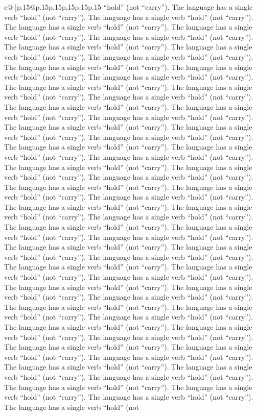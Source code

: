\documentclass{article}
\begin{document}
{\begin{supertabular}{c@{$\;$}|p{.15\linewidth}@{}p{.15\linewidth}p{.15\linewidth}p{.15\linewidth}p{.15\linewidth}p{.15\linewidth}}
{{{“hold” (not “carry”). The language has a single verb “hold” (not “carry”). The language has a single verb “hold” (not “carry”). The language has a single verb “hold” (not “carry”). The language has a single verb “hold” (not “carry”). The language has a single verb “hold” (not “carry”). The language has a single verb “hold” (not “carry”). The language has a single verb “hold” (not “carry”). The language has a single verb “hold” (not “carry”). The language has a single verb “hold” (not “carry”). The language has a single verb “hold” (not “carry”). The language has a single verb “hold” (not “carry”). The language has a single verb “hold” (not “carry”). The language has a single verb “hold” (not “carry”). The language has a single verb “hold” (not “carry”). The language has a single verb “hold” (not “carry”). The language has a single verb “hold” (not “carry”). The language has a single verb “hold” (not “carry”). The language has a single verb “hold” (not “carry”). The language has a single verb “hold” (not “carry”). The language has a single verb “hold” (not “carry”). The language has a single verb “hold” (not “carry”). The language has a single verb “hold” (not “carry”). The language has a single verb “hold” (not “carry”). The language has a single verb “hold” (not “carry”). The language has a single verb “hold” (not “carry”). The language has a single verb “hold” (not “carry”). The language has a single verb “hold” (not “carry”). The language has a single verb “hold” (not “carry”). The language has a single verb “hold” (not “carry”). The language has a single verb “hold” (not “carry”). The language has a single verb “hold” (not “carry”). The language has a single verb “hold” (not “carry”). The language has a single verb “hold” (not “carry”). The language has a single verb “hold” (not “carry”). The language has a single verb “hold” (not “carry”). The language has a single verb “hold” (not “carry”). The language has a single verb “hold” (not “carry”). The language has a single verb “hold” (not “carry”). The language has a single verb “hold” (not “carry”). The language has a single verb “hold” (not “carry”). The language has a single verb “hold” (not “carry”). The language has a single verb “hold” (not “carry”). The language has a single verb “hold” (not “carry”). The language has a single verb “hold” (not “carry”). The language has a single verb “hold” (not “carry”). The language has a single verb “hold” (not “carry”). The language has a single verb “hold” (not “carry”). The language has a single verb “hold” (not “carry”). The language has a single verb “hold” (not “carry”). The language has a single verb “hold” (not “carry”). The language has a single verb “hold” (not “carry”). The language has a single verb “hold” (not “carry”). The language has a single verb “hold” (not “carry”). The language has a single verb “hold” (not “carry”). The language has a single verb “hold” (not “carry”). The language has a single verb “hold” (not “carry”). The language has a single verb “hold” (not “carry”). The language has a single verb “hold” (not “carry”). The language has a single verb “hold” (not “carry”). The language has a single verb “hold” (not }}}
\end{supertabular}}
\end{document}
